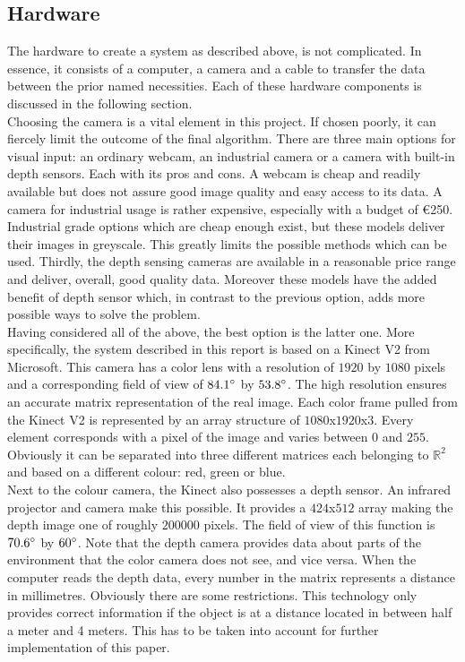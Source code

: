 \documentclass[11pt]{article}
\begin{document}
\subsection{Hardware}
The hardware to create a system as described above, is not complicated. In essence, it consists of a computer, a camera and a cable to transfer the data between the prior named necessities. Each of these hardware components is discussed in the following section.\\
Choosing the camera is a vital element in this project. If chosen poorly, it can fiercely limit the outcome of the final algorithm. There are three main options for visual input: an ordinary webcam, an industrial camera or a camera with built-in depth sensors. Each with its pros and cons. A webcam is cheap and readily available but does not assure good image quality and easy access to its data. A camera for industrial usage is rather expensive, especially with a budget of \euro 250. Industrial grade options which are cheap enough exist, but these models deliver their images in greyscale. This greatly limits the possible methods which can be used. Thirdly, the depth sensing cameras are available in a reasonable price range and deliver, overall, good quality data. Moreover these models have the added benefit of depth sensor which, in contrast to the previous option, adds more possible ways to solve the problem.\\
Having considered all of the above, the best option is the latter one. More specifically, the system described in this report is based on a Kinect V2 from Microsoft. This camera has a color lens with a resolution of $1920$ by $1080$ pixels and a corresponding field of view of $84.1\degree$ by $53.8\degree$\cite{kinect_specifications}. The high resolution ensures an accurate matrix representation of the real image. Each color frame pulled from the Kinect V2 is represented by an array structure of $1080$x$1920$x$3$. Every element corresponds with a pixel of the image and varies between $0$ and $255$. Obviously it can be separated into three different matrices each belonging to $\mathbb{R}^{2}$ and based on a different colour: red, green or blue.\\ Next to the colour camera, the Kinect also possesses a depth sensor. An infrared projector and camera make this possible\cite{kinect_v2}. It provides a $424$x$512$ array making the depth image one of roughly $200 000$ pixels. The field of view of this function is $70.6\degree$ by $60\degree$. Note that the depth camera provides data about parts of the environment that the color camera does not see, and vice versa. When the computer reads the depth data, every number in the matrix represents a distance in millimetres. Obviously there are some restrictions. This technology only provides correct information if the object is at a distance located in between half a meter and 4 meters. This has to be taken into account for further implementation of this paper.\\
\end{document}
